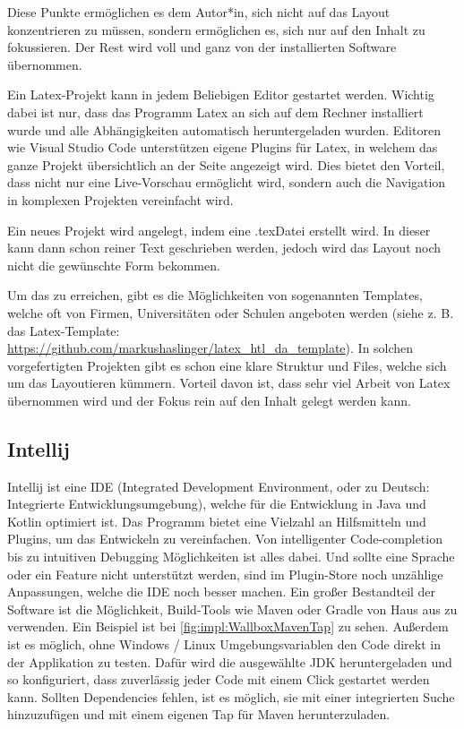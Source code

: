 Diese Punkte ermöglichen es dem Autor*in, sich nicht auf das Layout konzentrieren zu müssen, sondern ermöglichen es, sich nur auf den Inhalt zu fokussieren. Der Rest wird voll und ganz von der installierten Software übernommen.




Ein Latex-Projekt kann in jedem Beliebigen Editor gestartet werden. Wichtig dabei ist nur, dass das Programm Latex an sich auf dem Rechner installiert wurde und alle Abhängigkeiten automatisch heruntergeladen wurden. Editoren wie Visual Studio Code unterstützen eigene Plugins für Latex, in welchem das ganze Projekt übersichtlich an der Seite angezeigt wird. Dies bietet den Vorteil, dass nicht nur eine Live-Vorschau ermöglicht wird, sondern auch die Navigation in komplexen Projekten vereinfacht wird.




Ein neues Projekt wird angelegt, indem eine \grq.tex\grq Datei erstellt wird. In dieser kann dann schon reiner Text geschrieben werden, jedoch wird das Layout noch nicht die gewünschte Form bekommen.


Um das zu erreichen, gibt es die Möglichkeiten von sogenannten Templates, welche oft von Firmen, Universitäten oder Schulen angeboten werden (siehe z. B. das Latex-Template: \url{https://github.com/markushaslinger/latex_htl_da_template}). In solchen vorgefertigten Projekten gibt es schon eine klare Struktur und Files, welche sich um das Layoutieren kümmern. Vorteil davon ist, dass sehr viel Arbeit von Latex übernommen wird und der Fokus rein auf den Inhalt gelegt werden kann.
\cite{latexHeise}
\cite{LatexUniGraz}
\cite{LatexUni}


\subsection{Intellij} 


Intellij ist eine IDE (Integrated Development Environment, oder zu Deutsch: Integrierte Entwicklungsumgebung), welche für die Entwicklung in Java und Kotlin optimiert ist. Das Programm bietet eine Vielzahl an Hilfsmitteln und Plugins, um das Entwickeln zu vereinfachen. Von intelligenter Code-completion bis zu intuitiven Debugging Möglichkeiten ist alles dabei. Und sollte eine Sprache oder ein Feature nicht unterstützt werden, sind im Plugin-Store noch unzählige Anpassungen, welche die IDE noch besser machen. Ein großer Bestandteil der Software ist die Möglichkeit, Build-Tools wie Maven oder Gradle von Haus aus zu verwenden. Ein Beispiel ist bei \ref{fig:impl:WallboxMavenTap} zu sehen. Außerdem ist es möglich, ohne Windows / Linux Umgebungsvariablen den Code direkt in der Applikation zu testen. Dafür wird die ausgewählte JDK heruntergeladen und so konfiguriert, dass zuverlässig jeder Code mit einem Click gestartet werden kann. Sollten Dependencies fehlen, ist es möglich, sie mit einer integrierten Suche hinzuzufügen und mit einem eigenen Tap für Maven herunterzuladen.


